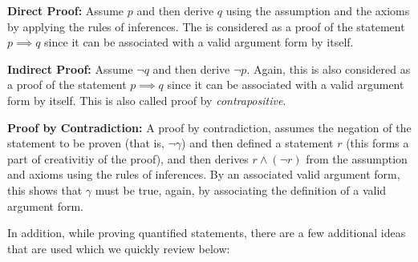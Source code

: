 \begin{description}
\item{\bf Direct Proof:} Assume $p$ and then derive $q$ using the assumption and the axioms by applying the rules of inferences. The is considered as a proof of the statement $p \implies q$ since it can be associated with a valid argument form by itself.
\item{\bf Indirect Proof:} Assume $\lnot q$ and then derive $\lnot p$. Again, this is also considered as a proof of the statement $p \implies q$ since it can be associated with a valid argument form by itself. This is also called proof by {\em contrapositive}.
\item{\bf Proof by Contradiction:}
A proof by contradiction, assumes the negation of the statement to be proven (that is, $\lnot \gamma$) and then defined a statement $r$ (this forms a part of creativitiy of the proof), and then derives $r \land (\lnot r)$ from the assumption and axioms using the rules of inferences. By an associated valid argument form, this shows that $\gamma$ must be true, again, by associating the definition of a valid argument form.
\end{description}
In addition, while proving quantified statements, there are a few additional ideas that are used which we quickly review below:
